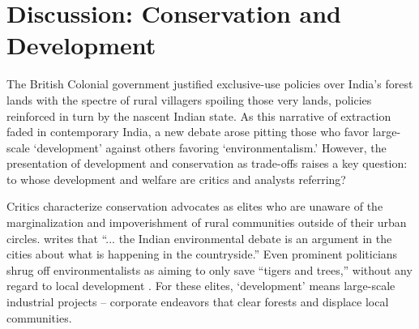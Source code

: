 \documentclass[12pt,reqno]{article}
\begin{document}











\section{Discussion: Conservation and Development} %
\label{sec:conclusion}




The British Colonial government justified exclusive-use policies over India's forest lands with the spectre of rural villagers spoiling those very lands, policies reinforced in turn by the nascent Indian state. As this narrative of extraction faded in contemporary India, a new debate arose pitting those who favor large-scale `development' against others favoring `environmentalism.' However, the presentation of development and conservation as trade-offs raises a key question: to whose development and welfare are critics and analysts referring? 

Critics characterize conservation advocates as elites who are unaware of the marginalization and impoverishment of rural communities outside of their urban circles. \textcite[57]{guha1992prehistory} writes that ``... the Indian environmental debate is an argument in the cities about what is happening in the countryside.'' Even prominent politicians shrug off environmentalists as aiming to only save ``tigers and trees,'' without any regard to local development \parencite[235]{baviskar1995belly}. For these elites, `development' means large-scale industrial projects -- corporate endeavors that clear forests and displace local communities.
\end{document}
